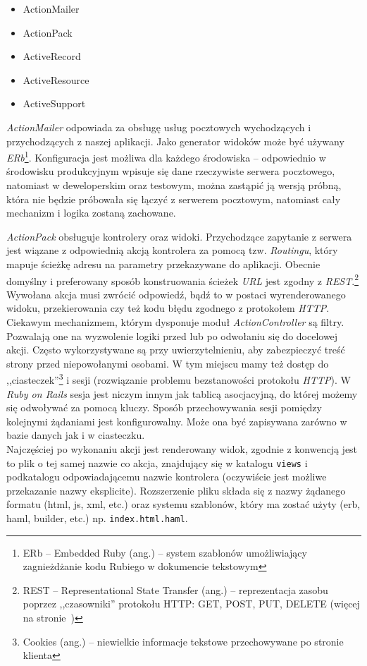 \documentclass[12pt,twoside]{report}
\begin{document}
\begin{itemize}
  \item{ActionMailer}
  \item{ActionPack}
  \item{ActiveRecord}
  \item{ActiveResource}
  \item{ActiveSupport}
\end{itemize}


\emph{ActionMailer} odpowiada za obsługę usług pocztowych wychodzących i przychodzących z
naszej aplikacji. Jako generator widoków może być używany \emph{ERb}\footnote{ERb --
Embedded Ruby (ang.) -- system szablonów umożliwiający zagnieżdżanie kodu Rubiego w
dokumencie tekstowym}. Konfiguracja jest możliwa dla każdego środowiska -- odpowiednio w
środowisku produkcyjnym wpisuje się dane rzeczywiste serwera pocztowego,
natomiast w deweloperskim oraz testowym, można zastąpić ją wersją próbną, która nie
będzie próbowała się łączyć z serwerem pocztowym, natomiast cały mechanizm i logika
zostaną zachowane.


\emph{ActionPack} obsługuje kontrolery oraz widoki. Przychodzące
zapytanie z serwera jest wiązane z odpowiednią akcją kontrolera za pomocą tzw.
\emph{Routingu}, który mapuje ścieżkę adresu na parametry przekazywane do aplikacji.
Obecnie domyślny i preferowany sposób konstruowania ścieżek \emph{URL} jest zgodny z
\emph{REST}.\footnote{REST -- Representational State Transfer (ang.) -- reprezentacja zasobu
poprzez ,,czasowniki'' protokołu HTTP: GET, POST, PUT, DELETE (więcej na stronie~\pageref{sec:rest})}\\
Wywołana akcja musi zwrócić odpowiedź, bądź to w postaci wyrenderowanego widoku,
przekierowania czy też kodu błędu zgodnego z protokołem \emph{HTTP}. Ciekawym mechanizmem,
którym dysponuje moduł \emph{ActionController} są filtry. Pozwalają one na wyzwolenie
logiki przed lub po odwołaniu się do docelowej akcji. Często wykorzystywane są przy
uwierzytelnieniu, aby zabezpieczyć treść strony przed niepowołanymi osobami. W tym
miejscu mamy też dostęp do ,,ciasteczek''\footnote{Cookies (ang.) -- niewielkie informacje
tekstowe przechowywane po stronie klienta} i sesji (rozwiązanie problemu bezstanowości
protokołu \emph{HTTP}). W \emph{Ruby on Rails} sesja jest niczym innym jak tablicą
asocjacyjną, do której możemy się odwoływać za pomocą kluczy. Sposób
przechowywania sesji pomiędzy kolejnymi żądaniami jest konfigurowalny. Może ona być
zapisywana zarówno w bazie danych jak i w ciasteczku.\\
Najczęściej po wykonaniu akcji jest renderowany widok, zgodnie z konwencją jest to plik o
tej samej nazwie co akcja, znajdujący się w katalogu \texttt{views} i podkatalogu
odpowiadającemu nazwie kontrolera (oczywiście jest możliwe przekazanie nazwy eksplicite).
Rozszerzenie pliku składa się z nazwy żądanego formatu (html, js, xml, etc.) oraz systemu
szablonów, który ma zostać użyty (erb, haml, builder, etc.) np. \texttt{index.html.haml}.
\end{document}
